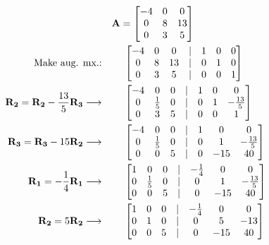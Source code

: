 \documentclass{article}
\begin{document}
\begin{align}
    \label{eq:1}
    && \textbf{A} &= \begin{bmatrix}
    -4 & 0 & 0\\
    0 & 8 & 13\\
    0 & 3 & 5
    \end{bmatrix}
    \\
    \label{eq:2}
    \text{Make aug. mx.:} && &\text{ } \begin{bmatrix}
    -4 & 0 & 0 &|& 1 & 0 & 0\\
    0 & 8 & 13 &|& 0 & 1 & 0\\
    0 & 3 & 5 &|& 0 & 0 & 1
    \end{bmatrix}
    \\
    \label{eq:3}
    \textbf{R\textsubscript{2}} = \textbf{R\textsubscript{2}} - \frac{13}{5}\textbf{R\textsubscript{3}} \longrightarrow && &\text{ } \begin{bmatrix}
    -4 & 0 & 0 &|& 1 & 0 & 0\\
    0 & \frac{1}{5} & 0 &|& 0 & 1 & -\frac{13}{5}\\
    0 & 3 & 5 &|& 0 & 0 & 1
    \end{bmatrix}
    \\
    \label{eq:4}
    \textbf{R\textsubscript{3}} = \textbf{R\textsubscript{3}} -15\textbf{R\textsubscript{2}} \longrightarrow && &\text{ } \begin{bmatrix}
    -4 & 0 & 0 &|& 1 & 0 & 0\\
    0 & \frac{1}{5} & 0 &|& 0 & 1 & -\frac{13}{5}\\
    0 & 0 & 5 &|& 0 & -15 & 40
    \end{bmatrix}
    \\
    \label{eq:5}
    \textbf{R\textsubscript{1}} = -\frac{1}{4}\textbf{R\textsubscript{1}} \longrightarrow && &\text{ } \begin{bmatrix}
    1 & 0 & 0 &|& -\frac{1}{4} & 0 & 0\\
    0 & \frac{1}{5} & 0 &|& 0 & 1 & -\frac{13}{5}\\
    0 & 0 & 5 &|& 0 & -15 & 40
    \end{bmatrix}
    \\
    \label{eq:6}
    \textbf{R\textsubscript{2}} = 5\textbf{R\textsubscript{2}} \longrightarrow && &\text{ } \begin{bmatrix}
    1 & 0 & 0 &|& -\frac{1}{4} & 0 & 0\\
    0 & 1 & 0 &|& 0 & 5 & -13\\
    0 & 0 & 5 &|& 0 & -15 & 40
    \end{bmatrix}

\end{align}
\end{document}
